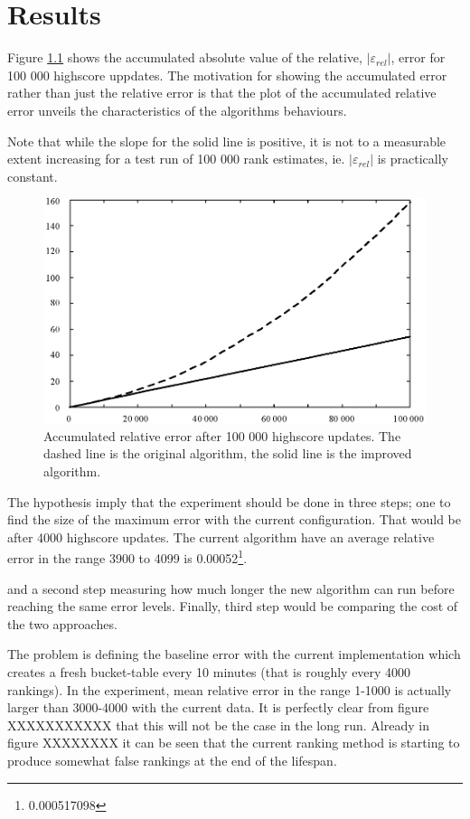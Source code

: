 \chapter{Results}

Figure \ref{fig:rel-error-100000} shows the accumulated absolute value of the relative, $|\varepsilon_{rel}|$, error for 100 000 highscore uppdates. The motivation for showing the accumulated error rather than just the relative error is that the plot of the accumulated relative error unveils the characteristics of the algorithms behaviours.

Note that while the slope for the solid line is positive, it is not to a measurable extent increasing for a test run of 100 000 rank estimates, ie. $|\varepsilon_{rel}|$ is practically constant.


\begin{figure}[h!]
  \centering
  \caption{Accumulated relative error after 100 000 highscore updates. The dashed line is the original algorithm, the solid line is the improved algorithm.}
  \label{fig:rel-error-100000}
  \includegraphics[width=12cm]{img/rel-error-100000.eps}
\end{figure} 

The hypothesis imply that the experiment should be done in three steps; one to find the size of the maximum error with the current configuration. That would be after 4000 highscore updates. The current algorithm have an average relative error in the range 3900 to 4099 is 0.00052\footnote{0.000517098}. 


and a second step measuring how much longer the new algorithm can run before reaching the same error levels. Finally, third step would be comparing the cost of the two approaches. 


The problem is defining the baseline error with the current implementation which creates a fresh bucket-table every 10 minutes (that is roughly every 4000 rankings). In the experiment, mean relative error in the range 1-1000 is actually larger than 3000-4000 with the current data. It is perfectly clear from figure XXXXXXXXXXX that this will not be the case in the long run. Already in figure XXXXXXXX it can be seen that the current ranking method is starting to produce somewhat false rankings at the end of the lifespan.



